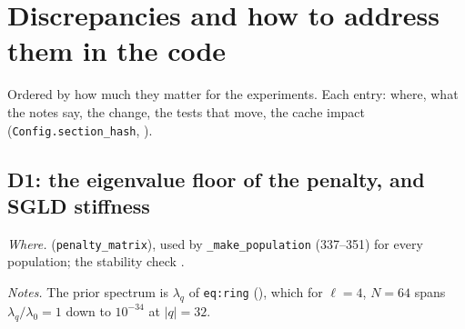 \documentclass[11pt,a4paper]{article}
\newcommand{\code}[1]{\texttt{#1}}
\begin{document}
\section{Discrepancies and how to address them in the code}
\label{sec:discrepancies}
Ordered by how much they matter for the experiments. Each entry: where, what the notes say, the change, the tests that move, the cache impact (\code{Config.section\_hash}, ).

\subsection{D1: the eigenvalue floor of the penalty, and SGLD stiffness}
\label{sec:D1}
\emph{Where.}  (\code{penalty\_matrix}), used by \code{\_make\_population} (337--351) for every population; the stability check .

\emph{Notes.} The prior spectrum is $\lambda_q$ of \code{eq:ring} (), which for $\ell = 4$, $N = 64$ spans $\lambda_q/\lambda_0 = 1$ down to $10^{-34}$ at $|q| = 32$.
\end{document}
